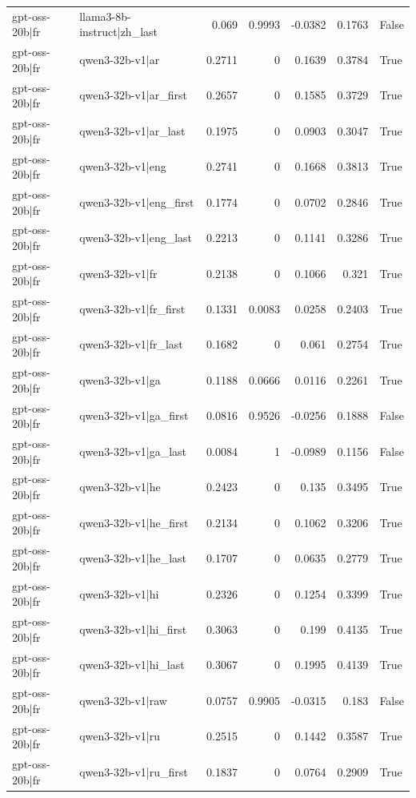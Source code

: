 \begin{table}
\begin{tabular}{l l r r r r l}
gpt-oss-20b|fr & llama3-8b-instruct|zh_last & 0.069 & 0.9993 & -0.0382 & 0.1763 & False \\
gpt-oss-20b|fr & qwen3-32b-v1|ar & 0.2711 & 0 & 0.1639 & 0.3784 & True \\
gpt-oss-20b|fr & qwen3-32b-v1|ar_first & 0.2657 & 0 & 0.1585 & 0.3729 & True \\
gpt-oss-20b|fr & qwen3-32b-v1|ar_last & 0.1975 & 0 & 0.0903 & 0.3047 & True \\
gpt-oss-20b|fr & qwen3-32b-v1|eng & 0.2741 & 0 & 0.1668 & 0.3813 & True \\
gpt-oss-20b|fr & qwen3-32b-v1|eng_first & 0.1774 & 0 & 0.0702 & 0.2846 & True \\
gpt-oss-20b|fr & qwen3-32b-v1|eng_last & 0.2213 & 0 & 0.1141 & 0.3286 & True \\
gpt-oss-20b|fr & qwen3-32b-v1|fr & 0.2138 & 0 & 0.1066 & 0.321 & True \\
gpt-oss-20b|fr & qwen3-32b-v1|fr_first & 0.1331 & 0.0083 & 0.0258 & 0.2403 & True \\
gpt-oss-20b|fr & qwen3-32b-v1|fr_last & 0.1682 & 0 & 0.061 & 0.2754 & True \\
gpt-oss-20b|fr & qwen3-32b-v1|ga & 0.1188 & 0.0666 & 0.0116 & 0.2261 & True \\
gpt-oss-20b|fr & qwen3-32b-v1|ga_first & 0.0816 & 0.9526 & -0.0256 & 0.1888 & False \\
gpt-oss-20b|fr & qwen3-32b-v1|ga_last & 0.0084 & 1 & -0.0989 & 0.1156 & False \\
gpt-oss-20b|fr & qwen3-32b-v1|he & 0.2423 & 0 & 0.135 & 0.3495 & True \\
gpt-oss-20b|fr & qwen3-32b-v1|he_first & 0.2134 & 0 & 0.1062 & 0.3206 & True \\
gpt-oss-20b|fr & qwen3-32b-v1|he_last & 0.1707 & 0 & 0.0635 & 0.2779 & True \\
gpt-oss-20b|fr & qwen3-32b-v1|hi & 0.2326 & 0 & 0.1254 & 0.3399 & True \\
gpt-oss-20b|fr & qwen3-32b-v1|hi_first & 0.3063 & 0 & 0.199 & 0.4135 & True \\
gpt-oss-20b|fr & qwen3-32b-v1|hi_last & 0.3067 & 0 & 0.1995 & 0.4139 & True \\
gpt-oss-20b|fr & qwen3-32b-v1|raw & 0.0757 & 0.9905 & -0.0315 & 0.183 & False \\
gpt-oss-20b|fr & qwen3-32b-v1|ru & 0.2515 & 0 & 0.1442 & 0.3587 & True \\
gpt-oss-20b|fr & qwen3-32b-v1|ru_first & 0.1837 & 0 & 0.0764 & 0.2909 & True \\

\end{tabular}
\end{table}
